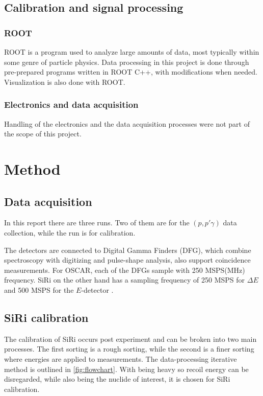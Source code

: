 \documentclass[a4paper,11pt]{article}
\begin{document}
\subsection{Calibration and signal processing}
\subsubsection{ROOT}
ROOT is a program used to analyze large amounts of data, most typically within some genre of particle physics. Data processing in this project is done through pre-prepared programs written in ROOT C++, with modifications when needed. Visualization is also done with ROOT.


\subsubsection{Electronics and data acquisition}
Handling of the electronics and the data acquisition processes were not part of the scope of this project. 

\newpage
\section{Method}
\subsection{Data acquisition}
In this report there are three runs. Two of them are for the $(p,p'\gamma)$ data collection, while the  run is for calibration. 


The detectors are  connected to Digital Gamma Finders (DFG), which combine spectroscopy with digitizing and pulse-shape analysis, also support coincidence measurements. For OSCAR, each of the DFGs sample with 250 MSPS(MHz) frequency. SiRi on the other hand has a sampling frequency of 250 MSPS for $\Delta E$ and 500 MSPS for the $E$-detector \cite{MMarkova}. 

\subsection{SiRi calibration}

The calibration of SiRi occurs post experiment and can be broken into two main processes. The first sorting is a rough sorting, while the second is a finer sorting where energies are applied to measurements. The data-processing iterative method is outlined in \cref{fig:flowchart}. With  being heavy so recoil energy can be disregarded, while also being the nuclide of interest, it is chosen for SiRi calibration. 
\end{document}
